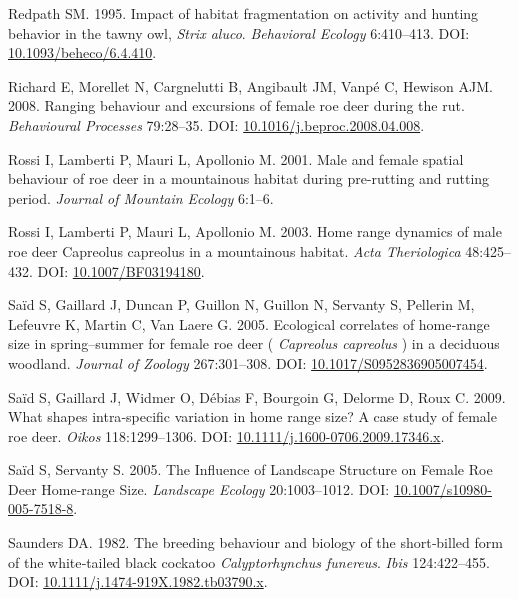 \documentclass[10pt,a4paper]{article}
\newlength{\cslhangindent}
\newenvironment{CSLReferences}[2] %
 {\begin{list}{}{%
  \setlength{\itemindent}{0pt}
  \setlength{\leftmargin}{0pt}
  \setlength{\parsep}{0pt}
  \ifodd #1
   \setlength{\leftmargin}{\cslhangindent}
   \setlength{\itemindent}{-1\cslhangindent}
  \fi
  \setlength{\itemsep}{#2\baselineskip}}}
 {\end{list}}
\begin{document}
\begin{CSLReferences}{1}{0}
Redpath SM. 1995. Impact of habitat fragmentation on activity and hunting behavior in the tawny owl, \emph{{Strix} aluco}. \emph{Behavioral Ecology} 6:410--413. DOI: \href{https://doi.org/10.1093/beheco/6.4.410}{10.1093/beheco/6.4.410}.

Richard E, Morellet N, Cargnelutti B, Angibault JM, Vanpé C, Hewison AJM. 2008. Ranging behaviour and excursions of female roe deer during the rut. \emph{Behavioural Processes} 79:28--35. DOI: \href{https://doi.org/10.1016/j.beproc.2008.04.008}{10.1016/j.beproc.2008.04.008}.

Rossi I, Lamberti P, Mauri L, Apollonio M. 2001. Male and female spatial behaviour of roe deer in a mountainous habitat during pre-rutting and rutting period. \emph{Journal of Mountain Ecology} 6:1--6.

Rossi I, Lamberti P, Mauri L, Apollonio M. 2003. Home range dynamics of male roe deer {Capreolus} capreolus in a mountainous habitat. \emph{Acta Theriologica} 48:425--432. DOI: \href{https://doi.org/10.1007/BF03194180}{10.1007/BF03194180}.

Saïd S, Gaillard J, Duncan P, Guillon N, Guillon N, Servanty S, Pellerin M, Lefeuvre K, Martin C, Van Laere G. 2005. Ecological correlates of home‐range size in spring--summer for female roe deer ( \emph{{Capreolus} capreolus} ) in a deciduous woodland. \emph{Journal of Zoology} 267:301--308. DOI: \href{https://doi.org/10.1017/S0952836905007454}{10.1017/S0952836905007454}.

Saïd S, Gaillard J, Widmer O, Débias F, Bourgoin G, Delorme D, Roux C. 2009. What shapes intra‐specific variation in home range size? {A} case study of female roe deer. \emph{Oikos} 118:1299--1306. DOI: \href{https://doi.org/10.1111/j.1600-0706.2009.17346.x}{10.1111/j.1600-0706.2009.17346.x}.

Saïd S, Servanty S. 2005. The {Influence} of {Landscape} {Structure} on {Female} {Roe} {Deer} {Home}-range {Size}. \emph{Landscape Ecology} 20:1003--1012. DOI: \href{https://doi.org/10.1007/s10980-005-7518-8}{10.1007/s10980-005-7518-8}.

Saunders DA. 1982. The breeding behaviour and biology of the short‐billed form of the white‐tailed black cockatoo \emph{{Calyptorhynchus} funereus}. \emph{Ibis} 124:422--455. DOI: \href{https://doi.org/10.1111/j.1474-919X.1982.tb03790.x}{10.1111/j.1474-919X.1982.tb03790.x}.


\end{CSLReferences}
\end{document}
